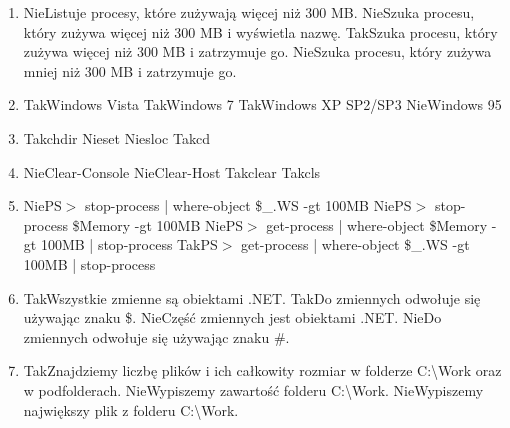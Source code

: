 \begin{enumerate}
		{Tak}{ls | where-object \{ \$\_.length -gt 2kB \} | rm}
		\item {}%
		{Nie}{Listuje procesy, które zużywają więcej niż 300 MB.}%
		{Nie}{Szuka procesu, który zużywa więcej niż 300 MB i wyświetla nazwę.}%
		{Tak}{Szuka procesu, który zużywa więcej niż 300 MB i zatrzymuje go.}%
		{Nie}{Szuka procesu, który zużywa mniej niż 300 MB i zatrzymuje go.}
		\item {}%
		{Tak}{Windows Vista}%
		{Tak}{Windows 7}%
		{Tak}{Windows XP SP2/SP3}%
		{Nie}{Windows 95}
		\item {}%
		{Tak}{chdir}%
		{Nie}{set}%
		{Nie}{sloc}%
		{Tak}{cd}
		\newpage
		\item {}%
		{Nie}{Clear-Console}%
		{Nie}{Clear-Host}%
		{Tak}{clear}%
		{Tak}{cls}
		\item {}%
		{Nie}{PS$ > $ stop-process | where-object { \$\_.WS -gt 100MB }}%
		{Nie}{PS$ > $ stop-process \$Memory -gt 100MB}%
		{Nie}{PS$ > $ get-process | where-object { \$Memory -gt 100MB } | stop-process}%
		{Tak}{PS$ > $ get-process | where-object { \$\_.WS -gt 100MB } | stop-process}
		\item {}%
		{Tak}{Wszystkie zmienne są obiektami .NET.}%
		{Tak}{Do zmiennych odwołuje się używając znaku \$.}%
		{Nie}{Część zmiennych jest obiektami .NET.}%
		{Nie}{Do zmiennych odwołuje się używając znaku \#.}
		\item {}%
		{Tak}{Znajdziemy liczbę plików i ich całkowity rozmiar w folderze C:\textbackslash Work oraz w podfolderach.}%
		{Nie}{Wypiszemy zawartość folderu C:\textbackslash Work.}%
		{Nie}{Wypiszemy największy plik z folderu C:\textbackslash Work.}%

\end{enumerate}
